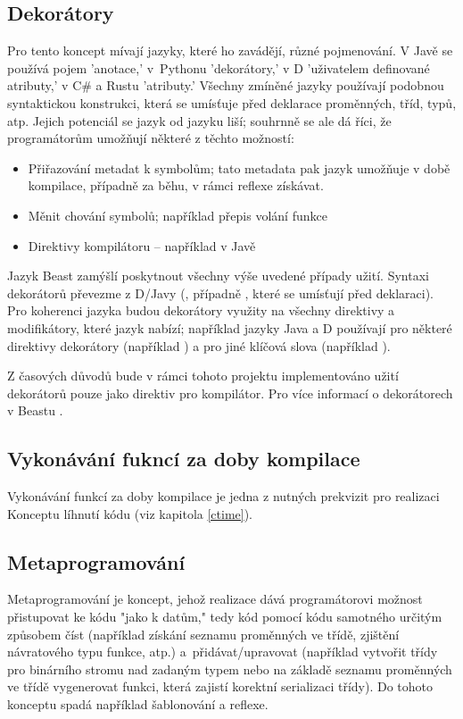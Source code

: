 \subsection{Dekorátory}
Pro tento koncept mívají jazyky, které ho zavádějí, různé pojmenování. V Javě se používá pojem 'anotace,' v~Pythonu 'dekorátory,' v D 'uživatelem definované atributy,' v C\# a Rustu 'atributy.' Všechny zmíněné jazyky používají podobnou syntaktickou konstrukci, která se umísťuje před deklarace proměnných, tříd, typů, atp. Jejich potenciál se jazyk od jazyku liší; souhrnně se ale dá říci, že programátorům umožňují některé z těchto možností:
\begin{itemize}
	\item Přiřazování metadat k symbolům; tato metadata pak jazyk umožňuje v době kompilace, případně za běhu, v rámci reflexe získávat.
	\item Měnit chování symbolů; například přepis volání funkce
	\item Direktivy kompilátoru -- například  v Javě
\end{itemize}

Jazyk Beast zamýšlí poskytnout všechny výše uvedené případy užití. Syntaxi dekorátorů převezme z D/Javy (, případně , které se umísťují před deklaraci). Pro koherenci jazyka budou dekorátory využity na všechny direktivy a modifikátory, které jazyk nabízí; například jazyky Java a D používají pro některé direktivy dekorátory (například ) a pro jiné klíčová slova (například ).

Z časových důvodů bude v rámci tohoto projektu implementováno užití dekorátorů pouze jako direktiv pro kompilátor. Pro více informací o dekorátorech v Beastu .

\subsection{Vykonávání fukncí za doby kompilace}
Vykonávání funkcí za doby kompilace je jedna z nutných prekvizit pro realizaci Konceptu líhnutí kódu (viz kapitola \ref{ctime}).

\subsection{Metaprogramování}
Metaprogramování je koncept, jehož realizace dává programátorovi možnost přistupovat ke kódu "jako k datům," tedy kód pomocí kódu samotného určitým způsobem číst (například získání seznamu proměnných ve třídě, zjištění návratového typu funkce, atp.) a~přidávat/upravovat (například vytvořit třídy pro binárního stromu nad zadaným typem nebo na základě seznamu proměnných ve třídě vygenerovat funkci, která zajistí korektní serializaci třídy). Do tohoto konceptu spadá například šablonování a reflexe.

